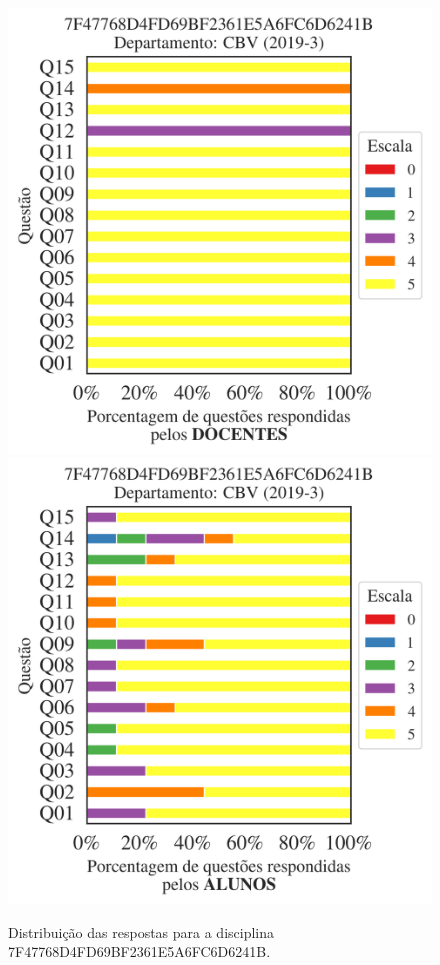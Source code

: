 \documentclass[a4paper,10pt]{article}
\begin{document}
\begin{figure}[h]
\centering
\includegraphics[width=0.485\linewidth]{analise_disciplina_departamento_CBV_7F47768D4FD69BF2361E5A6FC6D6241B_docentes.png}
\includegraphics[width=0.485\linewidth]{analise_disciplina_departamento_CBV_7F47768D4FD69BF2361E5A6FC6D6241B_alunos.png}
\caption{\label{fig:analise_geral_departamento}                Distribuição das respostas para a disciplina 7F47768D4FD69BF2361E5A6FC6D6241B. }
\end{figure}
\end{document}
